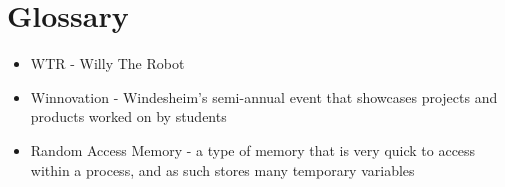 \section{Glossary}
\begin{itemize}
\item \label{trm::WTR} WTR - Willy The Robot
\item \label{trm::Winnovation} Winnovation - Windesheim's semi-annual event that showcases projects and products worked on by students
\item \label{trm::RAM} Random Access Memory - a type of memory that is very quick to access within a process, and as such stores many temporary variables
\end{itemize}